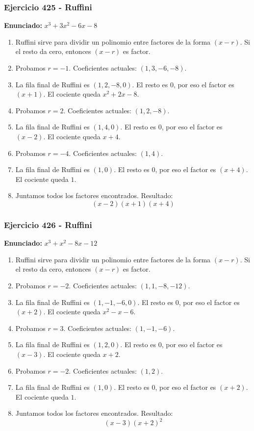 \documentclass[11pt,a4paper]{article}
\begin{document}
\vspace{0.2cm}
\subsubsection*{Ejercicio 425 - Ruffini}
\textbf{Enunciado:} $ x^{3} + 3 x^{2} - 6 x - 8 $\par
\begin{enumerate}[leftmargin=2em]
\item Ruffini sirve para dividir un polinomio entre factores de la forma \((x-r)\). Si el resto da cero, entonces \((x-r)\) es factor.
\item Probamos \(r=-1\). Coeficientes actuales: \((1, 3, -6, -8)\).
\item La fila final de Ruffini es \((1, 2, -8, 0)\). El resto es \(0\), por eso el factor es \((x+1)\). El cociente queda \(x^{2} + 2 x - 8\).
\item Probamos \(r=2\). Coeficientes actuales: \((1, 2, -8)\).
\item La fila final de Ruffini es \((1, 4, 0)\). El resto es \(0\), por eso el factor es \((x-2)\). El cociente queda \(x + 4\).
\item Probamos \(r=-4\). Coeficientes actuales: \((1, 4)\).
\item La fila final de Ruffini es \((1, 0)\). El resto es \(0\), por eso el factor es \((x+4)\). El cociente queda \(1\).
\item Juntamos todos los factores encontrados. Resultado: \[\boxed{\left(x - 2\right) \left(x + 1\right) \left(x + 4\right)}\]
\end{enumerate}

\vspace{0.2cm}
\subsubsection*{Ejercicio 426 - Ruffini}
\textbf{Enunciado:} $ x^{3} + x^{2} - 8 x - 12 $\par
\begin{enumerate}[leftmargin=2em]
\item Ruffini sirve para dividir un polinomio entre factores de la forma \((x-r)\). Si el resto da cero, entonces \((x-r)\) es factor.
\item Probamos \(r=-2\). Coeficientes actuales: \((1, 1, -8, -12)\).
\item La fila final de Ruffini es \((1, -1, -6, 0)\). El resto es \(0\), por eso el factor es \((x+2)\). El cociente queda \(x^{2} - x - 6\).
\item Probamos \(r=3\). Coeficientes actuales: \((1, -1, -6)\).
\item La fila final de Ruffini es \((1, 2, 0)\). El resto es \(0\), por eso el factor es \((x-3)\). El cociente queda \(x + 2\).
\item Probamos \(r=-2\). Coeficientes actuales: \((1, 2)\).
\item La fila final de Ruffini es \((1, 0)\). El resto es \(0\), por eso el factor es \((x+2)\). El cociente queda \(1\).
\item Juntamos todos los factores encontrados. Resultado: \[\boxed{\left(x - 3\right) \left(x + 2\right)^{2}}\]
\end{enumerate}
\end{document}
